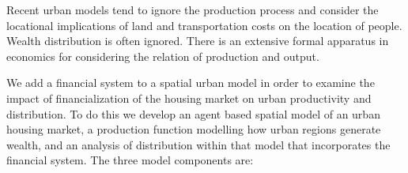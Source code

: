


Recent urban models %
tend to ignore the production process and consider the locational implications of land and transportation costs on the location of people. Wealth distribution is often ignored. 
There is an extensive formal apparatus in economics for considering the relation of production and output. 

We add a financial system to a spatial urban model %
in order to examine the impact of financialization of the housing market on urban productivity and distribution. 
To do this we develop an agent based  spatial model of an urban housing market, a production function modelling how urban regions generate wealth, and an analysis of distribution within that model that incorporates the financial system. 
The three model components are: 


